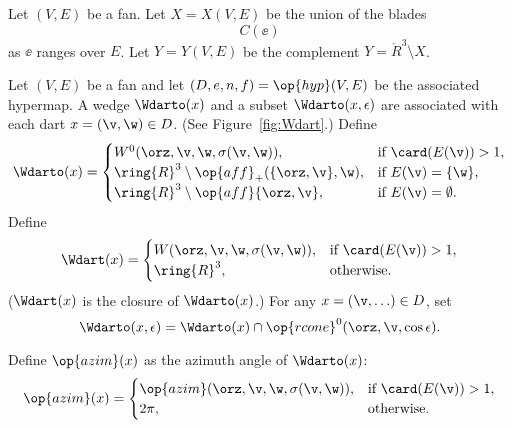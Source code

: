 \begin{definition}[X,~Y]\label{def:XY}
Let $(V,E)$ be a fan.  Let $X=X(V,E)$ be the union of the
blades
\[ C(\ee)\] 
as $\ee$ ranges over $E$.  Let $Y=Y(V,E)$ be the complement
$Y = \ring{R}^3\setminus X$.
%
%
\end{definition}

\begin{definition}[$\Wdarto$,~$\Wdart$]
Let $(V,E)$ be a fan and let $(D,e,n,f) = \op{hyp}(V,E)$
be the associated hypermap.  
A wedge $\Wdarto(x)$ and a subset $\Wdarto(x,\epsilon)$ are associated with
 each dart $x=(\v,\w)\in D$.  (See Figure~\ref{fig:Wdart}.)  Define 
%
%
%
%
%
%
%
%
%
%
\[ 
\Wdarto(x)=
\begin{cases} 
W^0(\orz,\v,\w,\sigma(\v,\w)),&\text{if }\card(E(\v))>1,\\
\ring{R}^3\setminus \op{aff}_+(\{\orz,\v\},\w),&\text{if } E(\v) = \{\w\},\\
\ring{R}^3\setminus \op{aff}\{\orz,\v\},&\text{if } E(\v) = \emptyset.\\
\end{cases}
\] 
Define
\[ 
\Wdart(x) = 
\begin{cases} 
W(\orz,\v,\w,\sigma(\v,\w)),&\text{if }\card(E(\v))>1,\\
\ring{R}^3,&\text{otherwise}.\\
\end{cases}
\] 
($\Wdart(x)$ is the closure of $\Wdarto(x)$.)
For any $x = (\v,\ldots)\in D$, set
\[ 
\Wdarto(x,\epsilon) = \Wdarto(x) \cap \op{rcone}^0(\orz,\v,\cos\epsilon).
\] 
%
\end{definition}

\figSCDMRGM %

\begin{definition}[$\op{azim}$]
Define $\op{azim}(x)$ as the azimuth angle of $\Wdarto(x)$:
%
\[ 
\op{azim}(x)=\begin{cases}
\op{azim}(\orz,\v,\w,\sigma(\v,\w)), &\text{if } \card(E(\v)) > 1,\\
2\pi, & \text{otherwise.}\\
\end{cases}
\] 
\end{definition}

